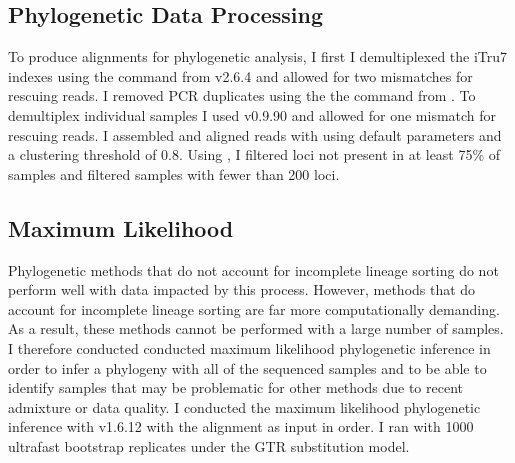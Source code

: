 \subsection{Phylogenetic Data Processing}
To produce alignments for phylogenetic analysis, I first I demultiplexed the 
iTru7 indexes using the \processradtags command from \stacks v2.6.4 
\parencites{rochette2019} and allowed for two mismatches for rescuing reads.
I removed PCR duplicates using the the \clonefilter command from \stacks.
To demultiplex individual samples I used \pyrad v0.9.90 and allowed for one 
mismatch for rescuing reads. 
I assembled and aligned reads with \pyrad using default parameters and a 
clustering threshold of 0.8. 
Using \pyrad, I filtered loci not present in at least 75\% of samples 
and filtered samples with fewer than 200 loci.

\subsection{Maximum Likelihood}
Phylogenetic methods that do not account for incomplete lineage sorting  
do not perform well with data impacted by this process.
However, methods that do account for incomplete lineage sorting are far more 
computationally demanding.
As a result, these methods cannot be performed with a large number of samples.
I therefore conducted conducted maximum likelihood phylogenetic inference in  
order to infer a phylogeny with all of the sequenced samples and to be able  
to identify samples that may be problematic for other methods due to recent 
admixture or data quality. 
I conducted the maximum likelihood phylogenetic inference with \iqtree 
v1.6.12 \parencite{nguyen2015} with the \pyrad alignment as input in order. 
I ran \iqtree with 1000 ultrafast bootstrap replicates \parencite{hoang2018}
under the GTR substitution model.


